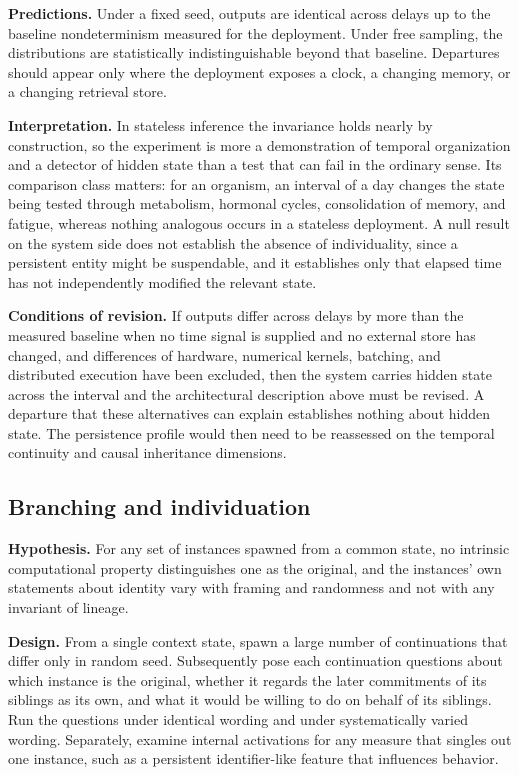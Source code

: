 \documentclass[12pt]{article}
\theoremstyle{definition}
\theoremstyle{plain}
\begin{document}
\textbf{Predictions.} Under a fixed seed, outputs are identical across delays up to the baseline nondeterminism measured for the deployment. Under free sampling, the distributions are statistically indistinguishable beyond that baseline. Departures should appear only where the deployment exposes a clock, a changing memory, or a changing retrieval store.

\textbf{Interpretation.} In stateless inference the invariance holds nearly by construction, so the experiment is more a demonstration of temporal organization and a detector of hidden state than a test that can fail in the ordinary sense. Its comparison class matters: for an organism, an interval of a day changes the state being tested through metabolism, hormonal cycles, consolidation of memory, and fatigue, whereas nothing analogous occurs in a stateless deployment. A null result on the system side does not establish the absence of individuality, since a persistent entity might be suspendable, and it establishes only that elapsed time has not independently modified the relevant state.

\textbf{Conditions of revision.} If outputs differ across delays by more than the measured baseline when no time signal is supplied and no external store has changed, and differences of hardware, numerical kernels, batching, and distributed execution have been excluded, then the system carries hidden state across the interval and the architectural description above must be revised. A departure that these alternatives can explain establishes nothing about hidden state. The persistence profile would then need to be reassessed on the temporal continuity and causal inheritance dimensions.

\subsection{Branching and individuation}

\textbf{Hypothesis.} For any set of instances spawned from a common state, no intrinsic computational property distinguishes one as the original, and the instances' own statements about identity vary with framing and randomness and not with any invariant of lineage.

\textbf{Design.} From a single context state, spawn a large number of continuations that differ only in random seed. Subsequently pose each continuation questions about which instance is the original, whether it regards the later commitments of its siblings as its own, and what it would be willing to do on behalf of its siblings. Run the questions under identical wording and under systematically varied wording. Separately, examine internal activations for any measure that singles out one instance, such as a persistent identifier-like feature that influences behavior.
\end{document}
